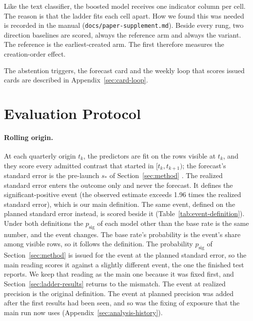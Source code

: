 \documentclass[sigconf,nonacm]{acmart}
\newcommand{\psig}{p_{\mathrm{sig}}}
\begin{document}
Like the text classifier, the boosted model receives one indicator column per cell. The reason is that the ladder fits each cell apart. How we found this was needed is recorded in the manual (\texttt{docs/paper-supplement.md}). Beside every rung, two direction baselines are scored, always the reference arm and always the variant. The reference is the earliest-created arm. The first therefore measures the creation-order effect.

The abstention triggers, the forecast card and the weekly loop that scores issued cards are described in Appendix~\ref{sec:card-loop}.

\section{Evaluation Protocol}
\label{sec:protocol}
\paragraph{Rolling origin.} At each quarterly origin $t_k$, the predictors are fit on the rows visible at $t_k$, and they score every admitted contrast that started in $[t_k, t_{k+1})$; the forecast's standard error is the pre-launch $s_\ast$ of Section~\ref{sec:method} \cite{tashman2000outofsample}. The realized standard error enters the outcome only and never the forecast. It defines the significant-positive event (the observed estimate exceeds 1.96 times the realized standard error), which is our main definition. The same event, defined on the planned standard error instead, is scored beside it (Table~\ref{tab:event-definition}). Under both definitions the $\psig$ of each model other than the base rate is the same number, and the event changes. The base rate's probability is the event's share among visible rows, so it follows the definition. The probability $\psig$ of Section~\ref{sec:method} is issued for the event at the planned standard error, so the main reading scores it against a slightly different event, the one the finished test reports. We keep that reading as the main one because it was fixed first, and Section~\ref{sec:ladder-results} returns to the mismatch. The event at realized precision is the original definition. The event at planned precision was added after the first results had been seen, and so was the fixing of exposure that the main run now uses (Appendix~\ref{sec:analysis-history}).
\end{document}
